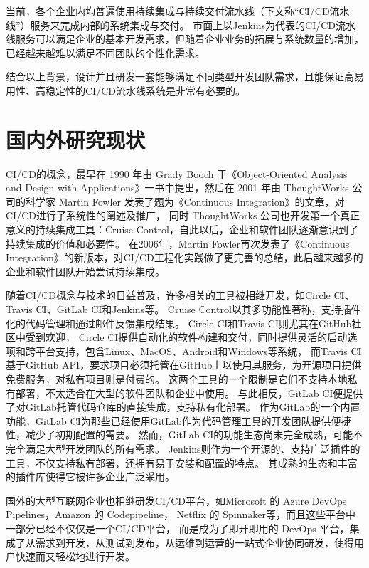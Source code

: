 当前，各个企业内均普遍使用持续集成与持续交付流水线（下文称“CI/CD流水线”）服务来完成内部的系统集成与交付\cite{1013369056.nh}。
市面上以Jenkins为代表的CI/CD流水线服务可以满足企业的基本开发需求，但随着企业业务的拓展与系统数量的增加，已经越来越难以满足不同团队的个性化需求。

结合以上背景，设计并且研发一套能够满足不同类型开发团队需求，且能保证高易用性、高稳定性的CI/CD流水线系统是非常有必要的。


\section{国内外研究现状}
CI/CD的概念，最早在 1990 年由 Grady Booch 于《Object-Oriented Analysis and Design with Applications》一书中提出\cite{booch1990object}，然后在 2001 年由 ThoughtWorks 公司的科学家 Martin Fowler 发表了题为《Continuous Integration》的文章，对CI/CD进行了系统性的阐述及推广\cite{CI首作}，
同时 ThoughtWorks 公司也开发第一个真正意义的持续集成工具：Cruise Control\cite{绪论持续集成1}，自此以后，企业和软件团队逐渐意识到了持续集成的价值和必要性。
在2006年，Martin Fowler再次发表了《Continuous Integration》的新版本，对CI/CD工程化实践做了更完善的总结\cite{fowler2006continuous}，此后越来越多的企业和软件团队开始尝试持续集成。

随着CI/CD概念与技术的日益普及，许多相关的工具被相继开发，如Circle CI、Travis CI、GitLab CI和Jenkins等。
Cruise Control以其多功能性著称，支持插件化的代码管理和通过邮件反馈集成结果\cite{徐仕成2007基于}。
Circle CI和Travis CI则尤其在GitHub社区中受到欢迎，
Circle CI提供自动化的软件构建和交付，同时提供灵活的启动选项和跨平台支持，包含Linux、MacOS、Android和Windows等系统\cite{hoang2020jamstack}，
而Travis CI基于GitHub API，要求项目必须托管在GitHub上以使用其服务，为开源项目提供免费服务，对私有项目则是付费的\cite{2018Use}。
这两个工具的一个限制是它们不支持本地私有部署，不太适合在大型的软件团队和企业中使用。
与此相反，GitLab CI便提供了对GitLab托管代码仓库的直接集成，支持私有化部署。
作为GitLab的一个内置功能，GitLab CI为那些已经使用GitLab作为代码管理工具的开发团队提供便捷性，减少了初期配置的需要。
然而，GitLab CI的功能生态尚未完全成熟，可能不完全满足大型开发团队的所有需求。
Jenkins则作为一个开源的、支持广泛插件的工具\cite{林新党2014基于}，不仅支持私有部署，还拥有易于安装和配置的特点。
其成熟的生态和丰富的插件库使得它被许多企业广泛采用。

国外的大型互联网企业也相继研发CI/CD平台，如Microsoft 的 Azure DevOps Pipelines，Amazon 的 Codepipeline，
Netflix 的 Spinnaker等，而且这些平台中一部分已经不仅仅是一个CI/CD平台，
而是成为了即开即用的 DevOps 平台，集成了从需求到开发，从测试到发布，从运维到运营的一站式企业协同研发，使得用户快速而又轻松地进行开发。


